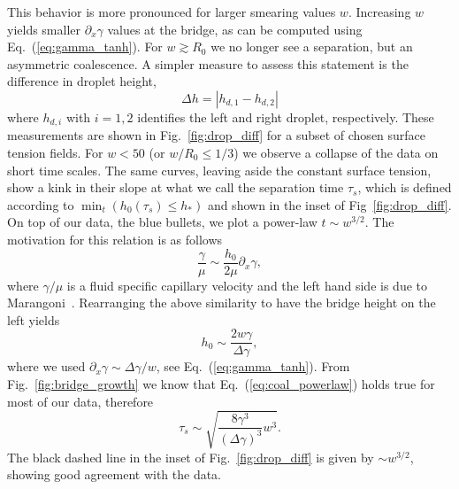 This behavior is more pronounced for larger smearing values $w$.
Increasing $w$ yields smaller $\partial_x\gamma$ values at the bridge, as can be computed using Eq.~(\ref{eq:gamma_tanh}). 
For $w\gtrsim R_0$ we no longer see a separation, but an asymmetric coalescence.
A simpler measure to assess this statement is the difference in droplet height,
\begin{equation}\label{eq:drop_diff_h}
    \Delta h = \left|h_{d,1} - h_{d,2}\right|
\end{equation}
where $h_{d,i}$ with $i=1,2$ identifies the left and right droplet, respectively.
These measurements are shown in Fig.~\ref{fig:drop_diff} for a subset of chosen surface tension fields.
For $w < 50$ (or $w/R_0 \le 1/3$) we observe a collapse of the data on short time scales.
The same curves, leaving aside the constant surface tension, show a kink in their slope at what we call the separation time $\tau_s$, which is defined according to $\min_t(h_0(\tau_{s}) \le h_{\ast})$ and shown in the inset of Fig~\ref{fig:drop_diff}.
On top of our data, the blue bullets, we plot a power-law $t \sim w^{3/2}$.
The motivation for this relation is as follows
\begin{equation}\label{eq:velsim1}
    \frac{\gamma}{\mu} \sim \frac{h_0}{2\mu}\partial_x\gamma,
\end{equation}
where $\gamma/\mu$ is a fluid specific capillary velocity and the left hand side is due to Marangoni~\cite{PhysRevLett.95.164503, doi:10.1021/la971292t}.
Rearranging the above similarity to have the bridge height on the left yields
\begin{equation}\label{velsim2}
    h_0 \sim \frac{2w\gamma}{\Delta\gamma},
\end{equation}
where we used $\partial_x\gamma \sim \Delta\gamma/w$, see Eq.~(\ref{eq:gamma_tanh}).
From Fig.~\ref{fig:bridge_growth} we know that Eq.~(\ref{eq:coal_powerlaw}) holds true for most of our data, therefore
\begin{equation}\label{velsim3}
    \tau_s \sim \sqrt{\frac{8\gamma^3}{(\Delta\gamma)^3}w^3}.
\end{equation}
The black dashed line in the inset of Fig.~\ref{fig:drop_diff} is given by $\sim w^{3/2}$, showing good agreement with the data.

